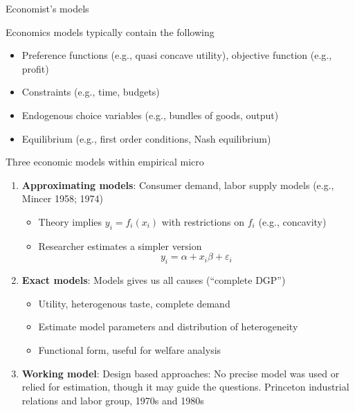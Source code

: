 \documentclass{beamer}
\begin{document}
\begin{frame}{Economist's models}

Economics models typically contain the following
	\begin{itemize}
	\item Preference functions (e.g., quasi concave utility), objective function (e.g., profit)
	\item Constraints (e.g., time, budgets)
	\item Endogenous choice variables (e.g., bundles of goods, output)
	\item Equilibrium (e.g., first order conditions, Nash equilibrium)
	\end{itemize}
\end{frame}




\begin{frame}{Three economic models within empirical micro}

\begin{enumerate}
\item \textbf{Approximating models}: Consumer demand, labor supply models (e.g., Mincer 1958; 1974)
	\begin{itemize}
	\item Theory implies $y_i=f_i(x_i)$ with restrictions on $f_i$ (e.g., concavity)
	\item Researcher estimates a simpler version $$y_i = \alpha + x_i \beta + \varepsilon_i$$
	\end{itemize}
\item \textbf{Exact models}: Models gives us all causes (``complete DGP'')
	\begin{itemize}
	\item Utility, heterogenous taste, complete demand
	\item Estimate model parameters and distribution of heterogeneity
	\item Functional form, useful for welfare analysis
	\end{itemize}
\item \textbf{Working model}: Design based approaches: No precise model was used or relied for estimation, though it may guide the questions. Princeton industrial relations and labor group, 1970s and 1980s
\end{enumerate}

\end{frame}
\end{document}
